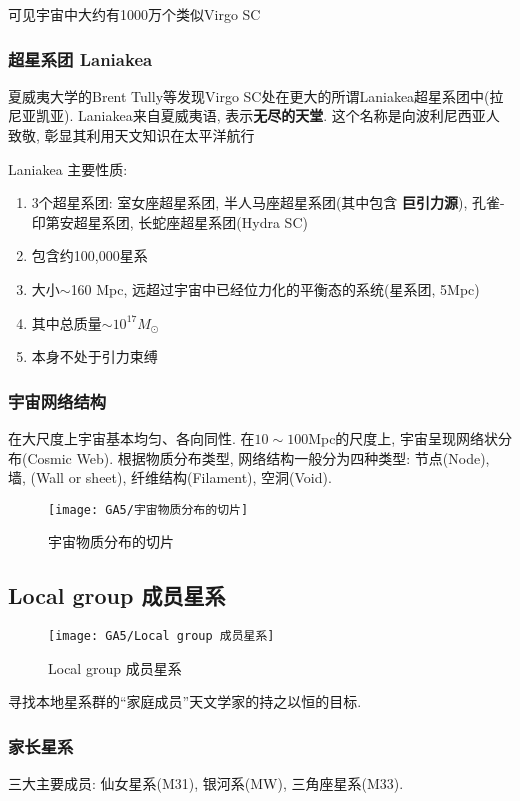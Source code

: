 可见宇宙中大约有1000万个类似Virgo SC

\subsubsection{超星系团 Laniakea}
夏威夷大学的Brent Tully等发现Virgo SC处在更大的所谓Laniakea超星系团中(拉尼亚凯亚). Laniakea来自夏威夷语, 表示\textbf{无尽的天堂}. 这个名称是向波利尼西亚人致敬, 彰显其利用天文知识在太平洋航行

Laniakea 主要性质:
\begin{enumerate}\small
    \item 3个超星系团: 室女座超星系团, 半人马座超星系团(其中包含 \textbf{巨引力源}), 孔雀-印第安超星系团, 长蛇座超星系团(Hydra SC)
    \item 包含约100,000星系
    \item 大小$\sim$160 Mpc, 远超过宇宙中已经位力化的平衡态的系统(星系团, 5Mpc)
    \item 其中总质量$\sim 10^{17} M_{\odot}$
    \item 本身不处于引力束缚
\end{enumerate}

\subsubsection{宇宙网络结构}
在大尺度上宇宙基本均匀、各向同性. 在$10\sim 100$Mpc的尺度上, 宇宙呈现网络状分布(Cosmic Web). 根据物质分布类型, 网络结构一般分为四种类型: 节点(Node), 墙, (Wall or sheet), 纤维结构(Filament), 空洞(Void). 

\begin{figure}[!htb]
    \centering
    \texttt{[image: GA5/宇宙物质分布的切片]}
    \caption{宇宙物质分布的切片}
\end{figure}

\subsection{Local group 成员星系}

\begin{figure}[!htb]
    \centering
    \texttt{[image: GA5/Local group 成员星系]}
    \caption{Local group 成员星系}
\end{figure}

寻找本地星系群的``家庭成员''天文学家的持之以恒的目标. 

\subsubsection{家长星系}
三大主要成员: 仙女星系(M31), 银河系(MW), 三角座星系(M33).
